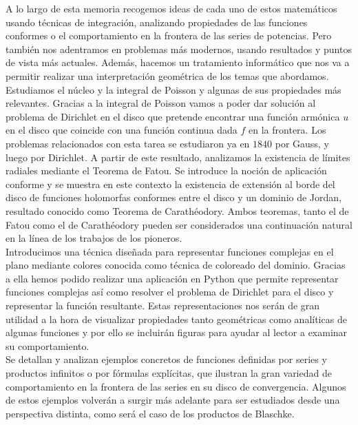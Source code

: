 A lo largo de esta memoria recogemos ideas de cada uno de estos matemáticos usando técnicas de integración, analizando propiedades de las funciones conformes o el comportamiento en la frontera de las series de potencias. Pero también nos adentramos en problemas más modernos, usando resultados y puntos de vista más actuales. Además, hacemos un tratamiento informático que nos va a permitir realizar una interpretación geométrica de los temas que abordamos. \\

Estudiamos el núcleo y la integral de Poisson y algunas de sus propiedades más relevantes. Gracias a la integral de Poisson vamos a poder dar solución al problema de Dirichlet en el disco que pretende encontrar una función armónica $u$ en el disco que coincide con una función continua dada $f$ en la frontera. Los problemas relacionados con esta tarea se estudiaron ya en $1840$ por Gauss, y luego por Dirichlet.
A partir de este resultado, analizamos la existencia de límites radiales mediante el Teorema de Fatou. Se introduce la noción de aplicación conforme y se muestra en este contexto la existencia de extensión al borde del disco de funciones holomorfas conformes entre el disco y un dominio de Jordan, resultado conocido como Teorema de Carathéodory. Ambos teoremas, tanto el de Fatou como el de Carathéodory pueden ser considerados una continuación natural en la línea de los trabajos de los pioneros. \\

Introducimos una técnica diseñada para representar funciones complejas en el plano mediante colores conocida como técnica de coloreado del dominio. Gracias a ella hemos podido realizar una aplicación en Python que permite representar funciones complejas así como resolver el problema de Dirichlet para el disco y representar la función resultante. Estas representaciones nos serán de gran utilidad a la hora de visualizar propiedades tanto geométricas como analíticas de algunas funciones y por ello se incluirán figuras para ayudar al lector a examinar su comportamiento. \\

Se detallan y analizan ejemplos concretos de funciones definidas por series y productos infinitos o por fórmulas explícitas, que ilustran la gran variedad de comportamiento en la frontera de las series en su disco de convergencia. Algunos de estos ejemplos volverán a surgir más adelante para ser estudiados desde una perspectiva distinta, como será el caso de los productos de Blaschke. \\

